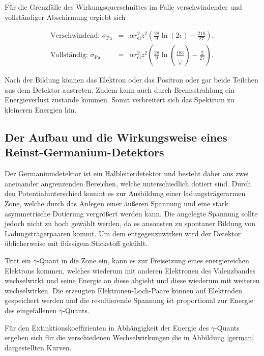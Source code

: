 Für die Grenzfälle des Wirkungsquerschnittes im Falle verschwindender und vollständiger Abschirmung ergiebt sich

\begin{eqnarray}
	\text{Verschwindend: } \sigma_\text{Pa} &=& \alpha r_\text{el}^2 z^2 \left(\frac{28}{9} \ln(2\epsilon) - \frac{218}{27}\right) ,\\
	\text{Vollständig: } \sigma_\text{Pa} &=& \alpha r_\text{el}^2 z^2 \left(\frac{28}{9} \ln(\frac{183}{\sqrt[3]{}}) - \frac{2}{27}\right) .
\end{eqnarray}

Nach der Bildung können das Elektron oder das Positron oder gar beide Teilchen aus dem Detektor austreten.
Zudem kann auch durch Bremsstrahlung ein Energieverlust zustande kommen.
Somit verbreitert sich das Spektrum zu kleineren Energien hin.
\FloatBarrier
\subsection{Der Aufbau und die Wirkungsweise eines Reinst-Germanium-Detektors} %
\label{sec:der_aufbau_und_die_wirkungsweise_eines_reinst_germanium_detektors}

Der Germaniumdetektor ist ein Halbleiterdetektor und besteht daher aus zwei aneinander angrenzenden Bereichen, welche unterschiedlich dotiert sind.
Durch den Potentialunterschied kommt es zur Ausbildung einer ladungsträgerarmen Zone, welche durch das Anlegen einer äußeren Spannung und eine stark asymmetrische Dotierung vergrößert werden kann.
Die angelegte Spannung sollte jedoch nicht zu hoch gewählt werden, da es ansonsten zu spontaner Bildung von Ladungsträgerpaaren kommt.
Um dem entgegenzuwirken wird der Detektor üblicherweise mit flüssigem Stickstoff gekühlt.

Tritt ein $\gamma$-Quant in die Zone ein, kann es zur Freisetzung eines energiereichen Elektrons kommen, welches wiederum mit anderen Elektronen des Valenzbandes wechselwirkt und seine Energie an diese abgiebt und diese wiederum mit weiteren wechselwirken.
Die erzeugten Elektronen-Loch-Paare können auf Elektroden gespeichert werden und die resultierende Spannung ist proportional zur Energie des eingefallenen $\gamma$-Quants.

Für den Extinktionskoeffizienten in Abhängigkeit der Energie des $\gamma$-Quants ergeben sich für die verschiedenen Wechselwirkungen die in Abbildung \ref{german} dargestellten Kurven.\\

